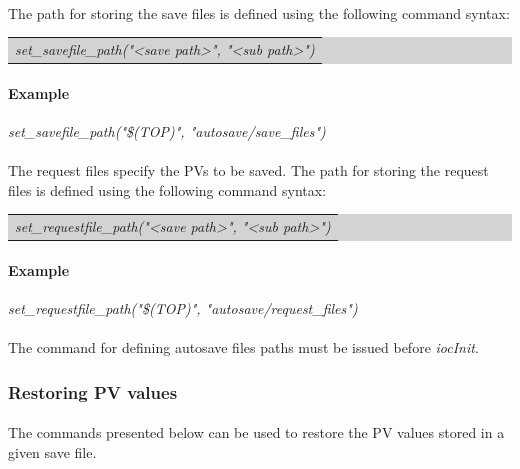 \documentclass[openany]{article}
\begin{document}
			\paragraph{} The path for storing the save files is defined using the following command syntax:

			\bigskip
			\colorbox{lightgray}{
				\begin{tabularx}{0.9\textwidth}{X}
				\emph{set\_savefile\_path("\textless save path\textgreater", "\textless sub path\textgreater")}
				\end{tabularx}
			}

			\paragraph{Example} \emph{set\_savefile\_path("\$(TOP)", "autosave/save\_files")}

			\paragraph{} The request files specify the PVs to be saved. The path for storing the request files is defined using the following command syntax:

			\bigskip
			\colorbox{lightgray}{
				\begin{tabularx}{0.9\textwidth}{X}
				\emph{set\_requestfile\_path("\textless save path\textgreater", "\textless sub path\textgreater")}
				\end{tabularx}
			}

			\paragraph{Example} \emph{set\_requestfile\_path("\$(TOP)", "autosave/request\_files")}

			\paragraph{} {\color{red}The command for defining autosave files paths must be issued before \emph{iocInit}.}

		\subsubsection{Restoring PV values}

			\paragraph{} The commands presented below can be used to restore the PV values stored in a given save file.
\end{document}
